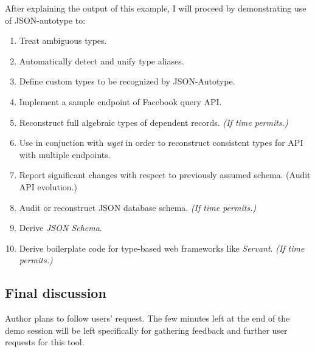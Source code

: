 \documentclass[11pt]{article}
\newcommand{\timePermits}[0]{\emph{(If time permits.)}}
\begin{document}
After explaining the output of this example, I will proceed by demonstrating use of JSON-autotype to:
\begin{enumerate}
\item Treat ambiguous types.
\item Automatically detect and unify type aliases.
\item Define custom types to be recognized by JSON-Autotype.
\item Implement a sample endpoint of Facebook query API.
\item Reconstruct full algebraic types of dependent records. \timePermits{}
\item Use in conjuction with \emph{wget} in order to reconstruct consistent types for API with multiple endpoints.
\item Report significant changes with respect to previously assumed schema. (Audit API evolution.)
\item Audit or reconstruct JSON database schema. \timePermits{}
\item Derive \emph{JSON Schema}.
\item Derive boilerplate code for type-based web frameworks like \emph{Servant}. \timePermits{}
\end{enumerate}


\subsection*{Final discussion}
Author plans to follow users' request. The few minutes left at the end of the demo session will be left specifically for gathering feedback and further user requests for this tool.

\end{document}
